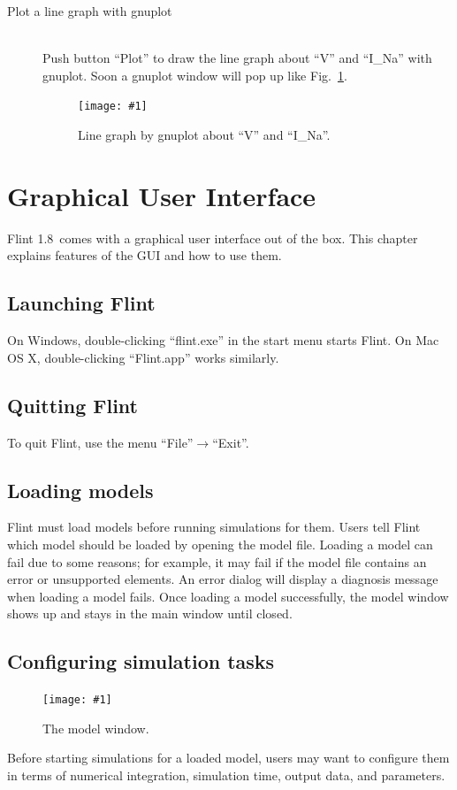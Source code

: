 \documentclass[a4paper,10pt]{report}
\def\FlintVersion{1.8}
\def\Flint{Flint \FlintVersion}
\newcommand\FigureOfImage[2]{\begin{figure}[h]
  \centering
  \texttt{[image: \#1]}
  \caption{#2}\label{fig:#1}
\end{figure}}
\begin{document}
\begin{description}
\item[Plot a line graph with gnuplot] \hfill \\
Push button ``Plot'' to draw the line graph about ``V'' and ``I\_Na'' with
gnuplot. Soon a gnuplot window will pop up like Fig.~\ref{fig:hh-gnuplot}.
\FigureOfImage{hh-gnuplot}{Line graph by gnuplot about ``V'' and ``I\_Na''.}
\end{description}



\chapter{Graphical User Interface}
\Flint\ comes with a graphical user interface out of the box. This chapter
explains features of the GUI and how to use them.

\section{Launching Flint}
On Windows, double-clicking ``flint.exe'' in the start menu starts Flint.
On Mac OS X, double-clicking ``Flint.app'' works similarly.

\section{Quitting Flint}
To quit Flint, use the menu ``File''$\rightarrow$``Exit''.

\section{Loading models}
Flint must load models before running simulations for them.
Users tell Flint which model should be loaded by opening the model file.
Loading a model can fail due to some reasons; for example, it may fail if
the model file contains an error or unsupported elements.
An error dialog will display a diagnosis message when loading a model fails.
Once loading a model successfully, the model window shows up and stays
in the main window until closed.

\section{Configuring simulation tasks}
\FigureOfImage{lr}{The model window.}
Before starting simulations for a loaded model, users may want to configure them
in terms of numerical integration, simulation time, output data, and parameters.
\end{document}

